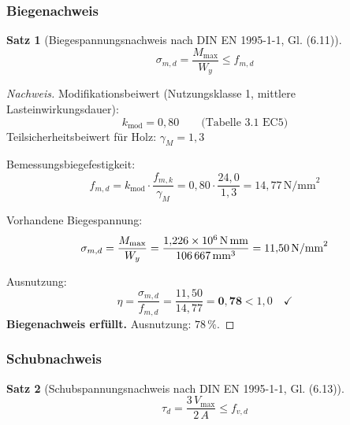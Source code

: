 ﻿\documentclass[12pt,a4paper]{article}
\theoremstyle{definition}
\theoremstyle{plain}
\newtheorem{theorem}{Satz}
\theoremstyle{remark}
\begin{document}
\subsubsection{Biegenachweis}

\begin{theorem}[Biegespannungsnachweis nach DIN EN 1995-1-1, Gl. (6.11)]
\begin{equation}
  \sigma_{m,d} = \frac{M_{\max}}{W_y} \leq f_{m,d}
\end{equation}
\end{theorem}

\begin{proof}[Nachweis]
Modifikationsbeiwert (Nutzungsklasse 1, mittlere Lasteinwirkungsdauer):
\begin{equation*}
  k_{\text{mod}} = 0{,}80 \qquad \text{(Tabelle 3.1 EC5)}
\end{equation*}
Teilsicherheitsbeiwert für Holz: $\gamma_M = 1{,}3$

Bemessungsbiegefestigkeit:
\begin{equation*}
  f_{m,d} = k_{\text{mod}} \cdot \frac{f_{m,k}}{\gamma_M}
          = 0{,}80 \cdot \frac{24{,}0}{1{,}3} = 14{,}77\,\text{N/mm}^2
\end{equation*}

Vorhandene Biegespannung:
\begin{equation*}
  \sigma_{m,d} = \frac{M_{\max}}{W_y}
              = \frac{1{,}226 \times 10^6\,\text{N\,mm}}{106\,667\,\text{mm}^3}
              = 11{,}50\,\text{N/mm}^2
\end{equation*}

Ausnutzung:
\begin{equation*}
  \eta = \frac{\sigma_{m,d}}{f_{m,d}} = \frac{11{,}50}{14{,}77} = \mathbf{0{,}78} < 1{,}0 \quad \checkmark
\end{equation*}
\textbf{Biegenachweis erfüllt.} Ausnutzung: $78\,\%$.
\end{proof}

\subsubsection{Schubnachweis}

\begin{theorem}[Schubspannungsnachweis nach DIN EN 1995-1-1, Gl. (6.13)]
\begin{equation}
  \tau_{d} = \frac{3\,V_{\max}}{2\,A} \leq f_{v,d}
\end{equation}
\end{theorem}
\end{document}
